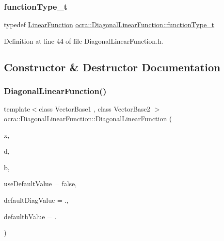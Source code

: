 \subsubsection{\texorpdfstring{function\+Type\+\_\+t}{functionType\_t}}
{\footnotesize\ttfamily typedef \hyperlink{classocra_1_1LinearFunction}{Linear\+Function} \hyperlink{classocra_1_1DiagonalLinearFunction_ab1d33ba63aea16f86fa88bf574333a39}{ocra\+::\+Diagonal\+Linear\+Function\+::function\+Type\+\_\+t}}



Definition at line 44 of file Diagonal\+Linear\+Function.\+h.



\subsection{Constructor \& Destructor Documentation}
\hypertarget{classocra_1_1DiagonalLinearFunction_ab96ebb7bcf93104dad806f1ac47a2e8f}{}\label{classocra_1_1DiagonalLinearFunction_ab96ebb7bcf93104dad806f1ac47a2e8f} 
\subsubsection{\texorpdfstring{Diagonal\+Linear\+Function()}{DiagonalLinearFunction()}\hspace{0.1cm}{\footnotesize\ttfamily [1/5]}}
{\footnotesize\ttfamily template$<$class Vector\+Base1 , class Vector\+Base2 $>$ \\
ocra\+::\+Diagonal\+Linear\+Function\+::\+Diagonal\+Linear\+Function (\begin{DoxyParamCaption}\item[{\hyperlink{classocra_1_1Variable}{Variable} \&}]{x,  }\item[{const Vector\+Base1 \&}]{d,  }\item[{const Vector\+Base2 \&}]{b,  }\item[{const bool}]{use\+Default\+Value = {\ttfamily false},  }\item[{const double}]{default\+Diag\+Value = {.},  }\item[{const double}]{defaultb\+Value = {.} }\end{DoxyParamCaption})\hspace{0.3cm}{\ttfamily [inline]}}

